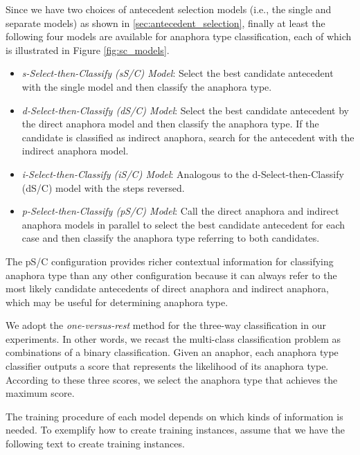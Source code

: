 \documentclass[english]{jnlp_1.4}
\begin{document}
Since we have two choices of antecedent selection models (i.e., the
single and separate models) as shown in
\ref{sec:antecedent_selection}, finally at least the following four
models are available for anaphora type classification, each of which
is illustrated in Figure \ref{fig:sc_models}.
\begin{itemize}
\item \emph{s-Select-then-Classify (sS/C) Model}: Select the best
  candidate antecedent with the single model and then classify the
  anaphora type.
\item \emph{d-Select-then-Classify (dS/C) Model}: Select the best
  candidate antecedent by the direct anaphora model and then classify
  the anaphora type. If the candidate is classified as indirect
  anaphora, search for the antecedent with the indirect anaphora
  model.
\item \emph{i-Select-then-Classify (iS/C) Model}: Analogous to the 
  d-Select-then-Classify (dS/C) model with the steps reversed.
\item \emph{p-Select-then-Classify (pS/C) Model}: Call the direct
  anaphora and indirect anaphora models in parallel to select the
  best candidate antecedent for each case and then classify the
  anaphora type referring to both candidates. 
\end{itemize}
The pS/C configuration provides richer contextual information for
classifying anaphora type than any other configuration because it can
always refer to the most likely candidate antecedents of direct
anaphora and indirect anaphora, which may be useful for determining
anaphora type.

We adopt the \emph{one-versus-rest} method for the three-way
classification in our experiments. In other words, we recast the
multi-class classification problem as combinations of a binary
classification. Given an anaphor, each anaphora type classifier
outputs a score that represents the likelihood of its anaphora
type. According to these three scores, we select the anaphora type that
achieves the maximum score.

The training procedure of each model depends on which kinds of
information is needed. To exemplify how to create training instances,
assume that we have the following text to create training instances.
\end{document}
